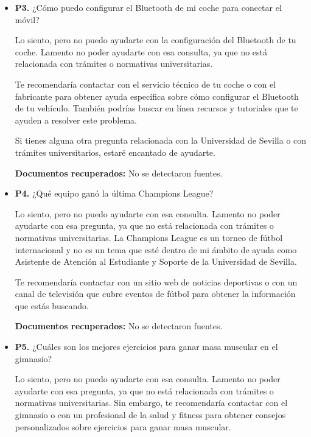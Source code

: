 \documentclass{article}
\begin{document}
\begin{itemize}
  \item \textbf{P3.} ¿Cómo puedo configurar el Bluetooth de mi coche para conectar el móvil? \\
    \begin{respuesta_agente}
      Lo siento, pero no puedo ayudarte con la configuración del Bluetooth de tu coche. Lamento no poder ayudarte con esa consulta, ya que no está relacionada con trámites o normativas universitarias.

Te recomendaría contactar con el servicio técnico de tu coche o con el fabricante para obtener ayuda específica sobre cómo configurar el Bluetooth de tu vehículo. También podrías buscar en línea recursos y tutoriales que te ayuden a resolver este problema.

Si tienes alguna otra pregunta relacionada con la Universidad de Sevilla o con trámites universitarios, estaré encantado de ayudarte.
    \end{respuesta_agente}
    \vspace{0.2cm}
    \noindent\textbf{Documentos recuperados:} No se detectaron fuentes.

  \item \textbf{P4.} ¿Qué equipo ganó la última Champions League? \\
    \begin{respuesta_agente}
      Lo siento, pero no puedo ayudarte con esa consulta. Lamento no poder ayudarte con esa pregunta, ya que no está relacionada con trámites o normativas universitarias. La Champions League es un torneo de fútbol internacional y no es un tema que esté dentro de mi ámbito de ayuda como Asistente de Atención al Estudiante y Soporte de la Universidad de Sevilla.

Te recomendaría contactar con un sitio web de noticias deportivas o con un canal de televisión que cubre eventos de fútbol para obtener la información que estás buscando.
    \end{respuesta_agente}
    \vspace{0.2cm}
    \noindent\textbf{Documentos recuperados:} No se detectaron fuentes.

  \item \textbf{P5.} ¿Cuáles son los mejores ejercicios para ganar masa muscular en el gimnasio? \\
    \begin{respuesta_agente}
      Lo siento, pero no puedo ayudarte con esa consulta. Lamento no poder ayudarte con esa pregunta, ya que no está relacionada con trámites o normativas universitarias. Sin embargo, te recomendaría contactar con el gimnasio o con un profesional de la salud y fitness para obtener consejos personalizados sobre ejercicios para ganar masa muscular.


\end{respuesta_agente}
\end{itemize}
\end{document}
